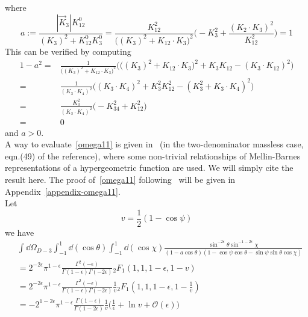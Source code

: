where 
\begin{equation}
a := \frac{|\vec{K}_3|K_{12}^0}{(K_3)^2 + K_{12}^0 K_3^0}
= \frac{K_{12}^2}{\big((K_3)^2 + K_{12}\cdot K_3\big)^2}\Big( -K_3^2 + \frac{(K_2\cdot K_3)^2}{K_{12}^2}\Big)
=1
\end{equation}
This can be verified by computing
\begin{equation}
\begin{split}
1-a^2 = &
\frac{1}{\big((K_3)^2 + K_{12}\cdot K_3\big)^2}
\Big( \big( (K_3)^2 + K_{12}\cdot K_3 \big)^2 + K_3K_{12} - (K_3\cdot K_{12})^2
\Big)
\\
= &
\frac{1}{(K_3\cdot K_4)^2} \Big( (K_3\cdot K_4)^2 + K_3^2K_{12}^2 - (K_3^2 + K_3\cdot K_4)^2 \Big)
\\
= &
\frac{K_3^2}{(K_3\cdot K_4)^2}\Big(-K_{34}^2 + K_{12}^2\Big)
\\
= & 0
\end{split}
\end{equation}
and $a>0$.
\\
A way to evaluate~\cref{omega11} is given in~\cite{Somogyi:2011ir} (in the two-denominator massless case, eqn.(49) of the reference), where some non-trivial relationships of Mellin-Barnes representations of a hypergeometric function are used.
We will simply cite the result here.
The proof of~\cref{omega11} following~\cite{Somogyi:2011ir} will be given in Appendix~\ref{appendix-omega11}.
\\
Let 
\begin{equation}
v = \frac{1}{2}(1-\cos\psi)
\end{equation}
we have
\begin{equation}\label{omega11}
\begin{split}
& \int \dd \Omega_{D-3}
\int_{-1}^1 \dd(\cos\theta)\int_{-1}^1\dd(\cos \chi)\frac{\sin^{-2\epsilon}\theta \sin^{-1-2\epsilon}\chi}{(1-a\cos\theta)(1-\cos\psi\cos\theta  - \sin\psi\sin\theta\cos\chi)}
\\
& = 
2^{-2\epsilon}\pi^{1-\epsilon}\frac{\Gamma^2(-\epsilon)}{\Gamma(1-\epsilon)\Gamma(-2\epsilon)}{}_2F_1(1,1,1-\epsilon, 1-v)
\\
& = 
2^{-2\epsilon}\pi^{1-\epsilon}\frac{\Gamma^2(-\epsilon)}{\Gamma(1-\epsilon)\Gamma(-2\epsilon)} \frac{1}{v}{}_2F_1(1,1,1-\epsilon, 1-\frac{1}{v})
\\
& = 
-2^{1-2\epsilon}\pi^{1-\epsilon} \frac{\Gamma(1-\epsilon)}{\Gamma(1-2\epsilon)}\frac{1}{v}\Big(\frac{1}{\epsilon}
+\ln v + \mathcal{O}(\epsilon)\Big)
\end{split}
\end{equation}
